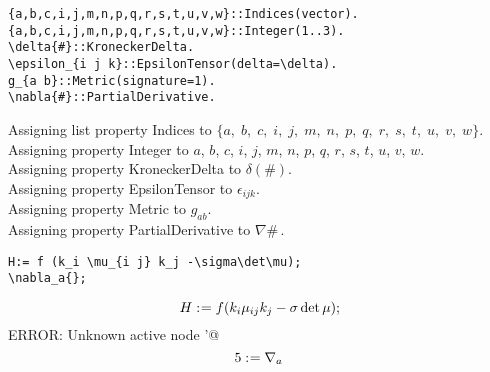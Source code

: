 \documentclass[11pt]{article}
\def\specialcolon{\mathrel{\mathop{:}}\hspace{-.5em}}
\begin{document}
{\color[named]{Blue}\begin{verbatim}
{a,b,c,i,j,m,n,p,q,r,s,t,u,v,w}::Indices(vector).
{a,b,c,i,j,m,n,p,q,r,s,t,u,v,w}::Integer(1..3).
\delta{#}::KroneckerDelta.
\epsilon_{i j k}::EpsilonTensor(delta=\delta).
g_{a b}::Metric(signature=1).
\nabla{#}::PartialDerivative.
\end{verbatim}}
Assigning list property Indices to $\{a,\; b,\; c,\; i,\; j,\; m,\; n,\; p,\; q,\; r,\; s,\; t,\; u,\; v,\; w\}$.
\\
Assigning property Integer to $a$, $b$, $c$, $i$, $j$, $m$, $n$, $p$, $q$, $r$, $s$, $t$, $u$, $v$, $w$.
\\
Assigning property KroneckerDelta to $\delta(\#)$.
\\
Assigning property EpsilonTensor to ${\epsilon}_{i j k}$.
\\
Assigning property Metric to ${g}_{a b}$.
\\
Assigning property PartialDerivative to $\nabla{\#}\, $.
\\
{\color[named]{Blue}\begin{verbatim}
H:= f (k_i \mu_{i j} k_j -\sigma\det\mu);
\nabla_a{};
\end{verbatim}}
\begin{dmath*}[compact, spread=2pt]
H\specialcolon{}= f ({k}_{i} {\mu}_{i j} {k}_{j} - \sigma \det \mu);
\end{dmath*}
{\color[named]{Red}%
ERROR: Unknown active node '@%
} %
\begin{dmath*}[compact, spread=2pt]
5\specialcolon{}= {\nabla}_{a}\,  %
\end{dmath*}
\end{document}

